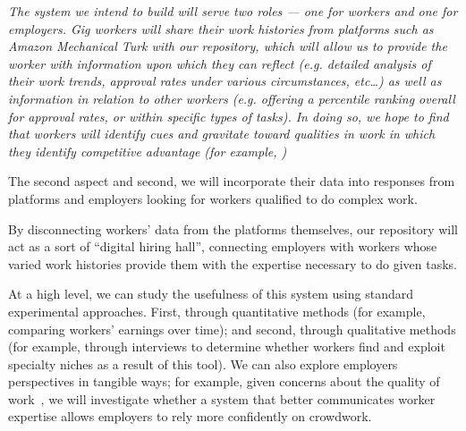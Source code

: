\documentclass{article}
\newcommand{\topic}[1]{{\color{Blue}#1}}
\newenvironment{blah}{\par\color{Gray}\itshape}{\par}
\begin{document}
\begin{blah}
\topic{The system we intend to build will serve two roles --- one for workers and one for employers.} %
Gig workers will share their work histories from platforms such as Amazon Mechanical Turk with our repository,
which will allow us to provide the worker with information upon which they can reflect
(e.g. detailed analysis of their work trends, approval rates under various circumstances, etc\dots)
as well as information in relation to other workers
(e.g. offering a percentile ranking overall for approval rates, or within specific types of tasks).
In doing so, we hope to find that workers will identify cues and gravitate toward qualities in work
in which they identify competitive advantage (for example, )

\topic{The second aspect }
and second, we will incorporate their data into responses from platforms and employers looking for workers qualified to do complex work.


By disconnecting workers' data from the platforms themselves, our repository will act as a sort of ``digital hiring hall'',
connecting employers with workers whose varied work histories provide them with the expertise necessary to do given tasks.
\end{blah}


\topic{At a high level, we can study the usefulness of this system using standard experimental approaches.}
First, through quantitative methods (for example, comparing workers' earnings over time); and
second, through qualitative  methods (for example, through interviews to determine whether workers find and exploit specialty niches as a result of this tool).
We can also explore employers perspectives in tangible ways;
for example, given concerns about the quality of work~\cite{Ipeirotis:2010:QMA:1837885.1837906,le2010ensuring,Law:2017:CTR:2998181.2998197},
we will investigate whether a system that better communicates worker expertise allows employers to rely more confidently on crowdwork.
\end{document}
